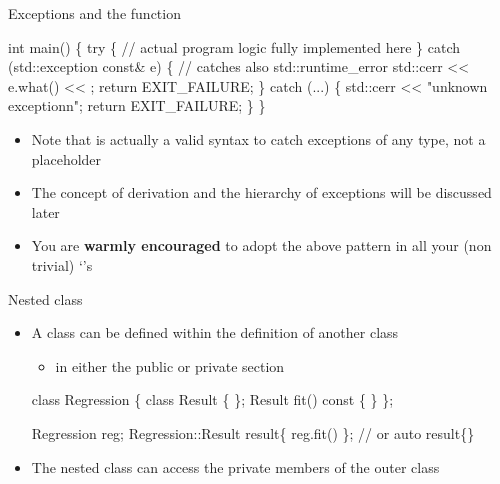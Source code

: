 \begin{frame}[fragile]{Exceptions and the  function}

    \begin{codeblock}
int main()
\{
  try \{
    \ddd // actual program logic fully implemented here
  \} catch (std::exception const& e) \{ // catches also std::runtime_error
    std::cerr << e.what() << \bslashn{};
    return EXIT_FAILURE;
  \} catch (...) \{
    std::cerr << "unknown exception\bslash{}n";
    return EXIT_FAILURE;
  \}
\}\end{codeblock}

  \begin{itemize}
  \item Note that  is actually a valid \Cpp{} syntax to catch
    exceptions of any type, not a placeholder
  \item The concept of derivation and the hierarchy of exceptions will be
    discussed later
  \item You are \textbf{warmly encouraged} to adopt the above pattern in all
    your (non trivial) `'s

  \end{itemize}
\end{frame}

\begin{frame}[fragile]{Nested class}
  \begin{itemize}

  \item A class can be defined within the definition of another class
    \begin{itemize}
    \item in either the public or private section
    \end{itemize}

    \begin{codeblock}
class Regression \{
  \ddd
  \alert{class Result \{ \ddd \};}
  Result fit() const \{ \ddd \}
\};

Regression reg;
\ddd
Regression::Result result\{ reg.fit() \}; // or auto result\{\ddd\}\end{codeblock}

  \item<2-> The nested class can access the private members of the outer class
  \end{itemize}

\end{frame}

